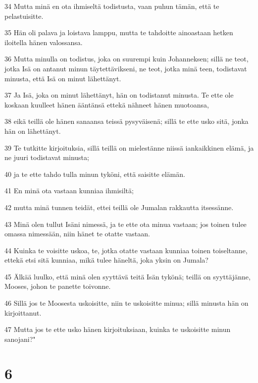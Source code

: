 \par 34 Mutta minä en ota ihmiseltä todistusta, vaan puhun tämän, että te pelastuisitte.
\par 35 Hän oli palava ja loistava lamppu, mutta te tahdoitte ainoastaan hetken iloitella hänen valossansa.
\par 36 Mutta minulla on todistus, joka on suurempi kuin Johanneksen; sillä ne teot, jotka Isä on antanut minun täytettävikseni, ne teot, jotka minä teen, todistavat minusta, että Isä on minut lähettänyt.
\par 37 Ja Isä, joka on minut lähettänyt, hän on todistanut minusta. Te ette ole koskaan kuulleet hänen ääntänsä ettekä nähneet hänen muotoansa,
\par 38 eikä teillä ole hänen sanaansa teissä pysyväisenä; sillä te ette usko sitä, jonka hän on lähettänyt.
\par 39 Te tutkitte kirjoituksia, sillä teillä on mielestänne niissä iankaikkinen elämä, ja ne juuri todistavat minusta;
\par 40 ja te ette tahdo tulla minun tyköni, että saisitte elämän.
\par 41 En minä ota vastaan kunniaa ihmisiltä;
\par 42 mutta minä tunnen teidät, ettei teillä ole Jumalan rakkautta itsessänne.
\par 43 Minä olen tullut Isäni nimessä, ja te ette ota minua vastaan; jos toinen tulee omassa nimessään, niin hänet te otatte vastaan.
\par 44 Kuinka te voisitte uskoa, te, jotka otatte vastaan kunniaa toinen toiseltanne, ettekä etsi sitä kunniaa, mikä tulee häneltä, joka yksin on Jumala?
\par 45 Älkää luulko, että minä olen syyttävä teitä Isän tykönä; teillä on syyttäjänne, Mooses, johon te panette toivonne.
\par 46 Sillä jos te Moosesta uskoisitte, niin te uskoisitte minua; sillä minusta hän on kirjoittanut.
\par 47 Mutta jos te ette usko hänen kirjoituksiaan, kuinka te uskoisitte minun sanojani?"

\chapter{6}

